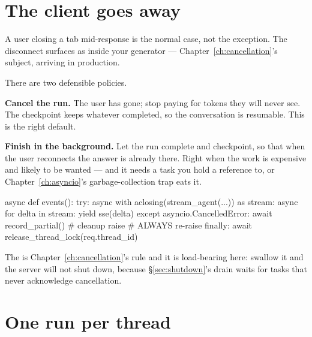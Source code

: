 \section{The client goes away}
\label{sec:disconnect}

A user closing a tab mid-response is the normal case, not the exception. The
disconnect surfaces as  inside your generator ---
Chapter~\ref{ch:cancellation}'s subject, arriving in production.


There are two defensible policies.

\textbf{Cancel the run.} The user has gone; stop paying for tokens they will
never see. The checkpoint keeps whatever completed, so the conversation is
resumable. This is the right default.

\textbf{Finish in the background.} Let the run complete and checkpoint, so that
when the user reconnects the answer is already there. Right when the work is
expensive and likely to be wanted --- and it needs a task you hold a reference
to, or Chapter~\ref{ch:asyncio}'s garbage-collection trap eats it.

\begin{python}[caption={Cleaning up either way}, label={lst:disconnect}]
async def events():
    try:
        async with aclosing(stream_agent(...)) as stream:
            async for delta in stream:
                yield sse(delta)
    except asyncio.CancelledError:
        await record_partial()        # cleanup
        raise                         # ALWAYS re-raise
    finally:
        await release_thread_lock(req.thread_id)
\end{python}

The  is Chapter~\ref{ch:cancellation}'s rule and it is
load-bearing here: swallow it and the server will not shut down, because
\S\ref{sec:shutdown}'s drain waits for tasks that never acknowledge cancellation.

\section{One run per thread}
\label{sec:thread-lock}

